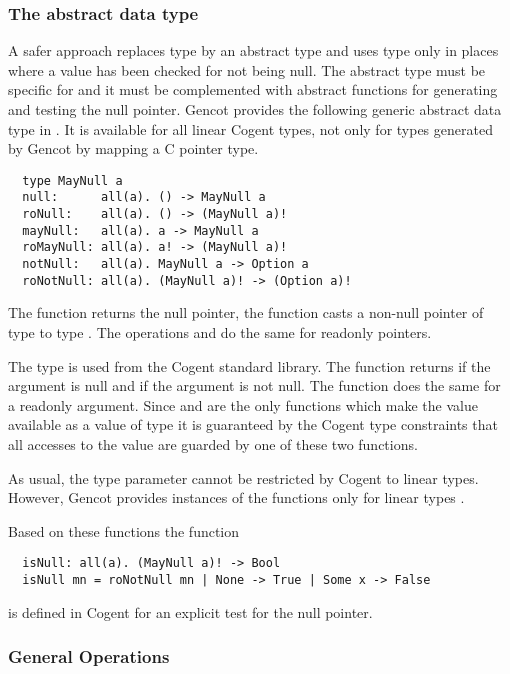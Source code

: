 \subsubsection{The abstract data type }

A safer approach replaces type  by an abstract type and uses type  only in places where a value has been checked
for not being null. The abstract type must be specific for  and it must be complemented with abstract functions for
generating and testing the null pointer. Gencot provides the following generic abstract data type in .
It is available for all linear Cogent types, not only for types generated by Gencot by mapping a C pointer type.
\begin{verbatim}
  type MayNull a 
  null:      all(a). () -> MayNull a
  roNull:    all(a). () -> (MayNull a)!
  mayNull:   all(a). a -> MayNull a
  roMayNull: all(a). a! -> (MayNull a)!
  notNull:   all(a). MayNull a -> Option a
  roNotNull: all(a). (MayNull a)! -> (Option a)!
\end{verbatim}
The function  returns the null pointer, the function  casts a non-null pointer of type 
to type . The operations  and  do the same for readonly pointers. 

The type  is used from the Cogent standard library. 
The function  returns  if the argument is null and  if the argument  is not null.
The function  does the same for a readonly argument. 
Since  and  are the only functions which make the value available as a value of type  
it is guaranteed by the Cogent type constraints that all accesses to the value are guarded by one of these two functions. 

As usual,
the type parameter  cannot be restricted by Cogent to linear types. However, Gencot provides instances of the functions only for
linear types .

Based on these functions the function
\begin{verbatim}
  isNull: all(a). (MayNull a)! -> Bool
  isNull mn = roNotNull mn | None -> True | Some x -> False
\end{verbatim}
is defined in Cogent for an explicit test for the null pointer.

\subsubsection{General Operations}

